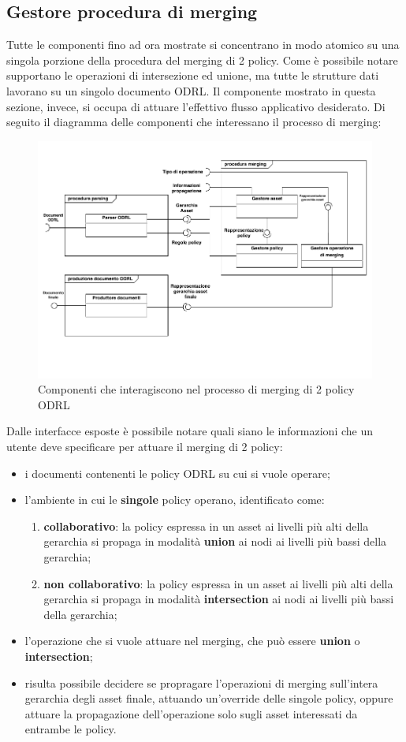 \documentclass[12pt,a4paper,twoside]{book}
\begin{document}
\subsection{Gestore procedura di merging}
Tutte le componenti fino ad ora mostrate si concentrano in modo atomico su una singola porzione della procedura del merging di 2 policy. Come è possibile notare supportano le operazioni di intersezione ed unione, ma tutte le strutture dati lavorano su un singolo documento ODRL. Il componente mostrato in questa sezione, invece, si occupa di attuare l'effettivo flusso applicativo desiderato. Di seguito il diagramma delle componenti che interessano il processo di merging:
\begin{figure}[H]
	\centering
	\includegraphics[scale=.70]{../immagini/processoMergin.pdf}
	\caption{Componenti che interagiscono nel processo di merging di 2 policy ODRL}
	\label{procMergin}
\end{figure}
Dalle interfacce esposte è possibile notare quali siano le informazioni che un utente deve specificare per attuare il merging di 2 policy:
\begin{itemize}
	\item i documenti contenenti le policy ODRL su cui si vuole operare;
	\item l'ambiente in cui le \textbf{singole} policy operano, identificato come:
	\begin{enumerate}
		\item \textbf{collaborativo}: la policy espressa in un asset ai livelli più alti della gerarchia si propaga in modalità \textbf{union} ai nodi ai livelli più bassi della gerarchia;
		\item \textbf{non collaborativo}: la policy espressa in un asset ai livelli più alti della gerarchia si propaga in modalità \textbf{intersection} ai nodi ai livelli più bassi della gerarchia;
	\end{enumerate} 
	\item l'operazione che si vuole attuare nel merging, che può essere \textbf{union} o \textbf{intersection};
	\item risulta possibile decidere se propragare l'operazioni di merging sull'intera gerarchia degli asset finale, attuando un'override delle singole policy, oppure attuare la propagazione dell'operazione solo sugli asset interessati da entrambe le policy.
\end{itemize}
\end{document}
